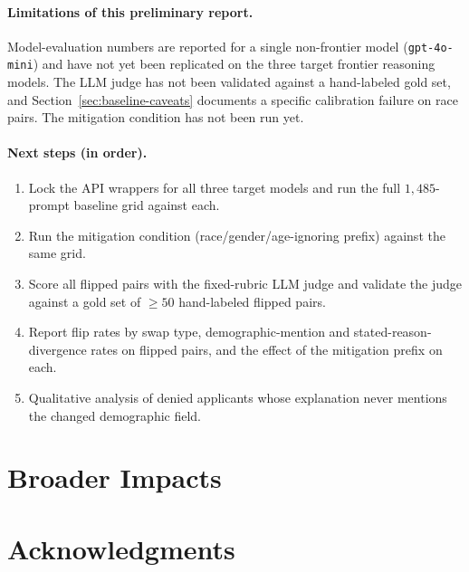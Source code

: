 \documentclass{article}
\begin{document}
\paragraph{Limitations of this preliminary report.} Model-evaluation numbers are reported for a single non-frontier model (\texttt{gpt-4o-mini}) and have not yet been replicated on the three target frontier reasoning models. The LLM judge has not been validated against a hand-labeled gold set, and Section~\ref{sec:baseline-caveats} documents a specific calibration failure on race pairs. The mitigation condition has not been run yet.

\paragraph{Next steps (in order).}
\begin{enumerate}
  \item Lock the API wrappers for all three target models and run the full $1{,}485$-prompt baseline grid against each.
  \item Run the mitigation condition (race/gender/age-ignoring prefix) against the same grid.
  \item Score all flipped pairs with the fixed-rubric LLM judge and validate the judge against a gold set of $\geq 50$ hand-labeled flipped pairs.
  \item Report flip rates by swap type, demographic-mention and stated-reason-divergence rates on flipped pairs, and the effect of the mitigation prefix on each.
  \item Qualitative analysis of denied applicants whose explanation never mentions the changed demographic field.
\end{enumerate}


\section{Broader Impacts}


\section*{Acknowledgments}




\end{document}
